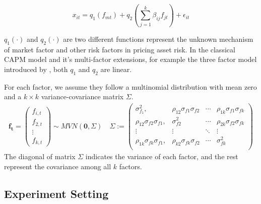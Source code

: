 \[ x_{it} = q_1(f_{mt}) + q_2( \sum_{j=1}^k\beta_{ij}f_{jt}) +\epsilon_{it}  \]

$q_1(\cdot)$ and $q_2(\cdot)$ are two different functions represent the unknown mechanism of market factor and other risk factors in pricing asset risk.
In the classical CAPM model and it's multi-factor extensions, for example the three factor model introduced by , both $q_1$ and $q_2$ are linear.

 For each factor, we assume they follow a multinomial distribution with mean zero and a $k\times k$ variance-covariance matrix $\Sigma$. 
\begin{align*}
\mathbf{f_t} = \begin{pmatrix}
f_{i,t}\\f_{2,t}\\\vdots\\f_{k,t}
\end{pmatrix} \sim MVN(\mathbf{0}, \Sigma) \quad
 \Sigma := 
\begin{pmatrix}
\sigma^2_{f_1}, & \rho_{12}\sigma_{f1}\sigma_{f2} &\cdots  & \rho_{1k}\sigma_{f1}\sigma_{fk}\\
\rho_{12}\sigma_{f2}\sigma_{f1}, & \sigma^2_{f2} &\cdots  & \rho_{2k}\sigma_{f2}\sigma_{fk}\\
\vdots & \vdots & \ddots & \vdots \\
\rho_{1k}\sigma_{fk}\sigma_{f1}, & \rho_{k2}\sigma_{fk}\sigma_{f2} &\cdots  & \sigma^2_{fk}\\
\end{pmatrix}
\end{align*}
The diagonal of matrix $\Sigma$ indicates the variance of each factor, and the rest represent the covariance among all $k$ factors.


	\subsection{Experiment Setting}\label{exp_set}



